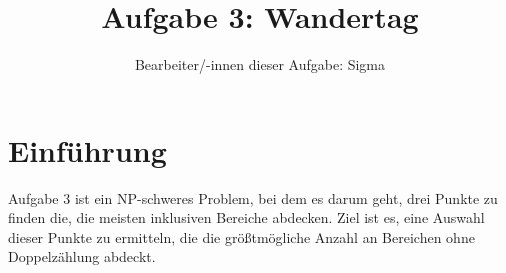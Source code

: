 \usepackage[T1]{fontenc}
\usepackage{textcomp}
\usepackage{booktabs} %
\usepackage{authblk} %
\usepackage{graphicx} %
\usepackage{amsmath}
\usepackage[utf8]{inputenc}
\usepackage[T1]{fontenc}
\usepackage{lmodern}
\usepackage[utf8]{inputenc}
\usepackage[T1]{fontenc}
\usepackage{lmodern}
\usepackage{xcolor}
\usepackage{listings}
\usepackage{array}
\usepackage{tabularx}
\usepackage{listings}





\usepackage{listings}
\usepackage{xcolor}




\author{Bearbeiter/-innen dieser Aufgabe: Sigma}


\title{Aufgabe 3: Wandertag}



\maketitle

\begin{abstract}
    \noindent {}
\end{abstract}

\section{Einführung}

Aufgabe 3 ist ein NP-schweres Problem, bei dem es darum geht, drei Punkte zu finden die, die meisten inklusiven Bereiche abdecken. Ziel ist es, eine Auswahl dieser Punkte zu ermitteln, die die größtmögliche Anzahl an Bereichen ohne Doppelzählung abdeckt. 

